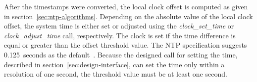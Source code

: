 After the timestamps were converted, the local clock offset is computed
as given in section~\ref{sec:ntp-algorithms}.
Depending on the absolute value of the local clock offset,
the system time is either set or adjusted using the {\it{clock\_set\_time}}
or {\it{clock\_adjust\_time}} call, respectively.
The clock is set if the time difference is equal or greater than
the offset threshold value.
The NTP specification suggests 0.125~seconds as the default~\cite{rfc5905}.
Because the designed call for setting the time, described in section~\ref{sec:design-interface},
can set the time only within a resolution of one second,
the threshold value must be at least one second.
